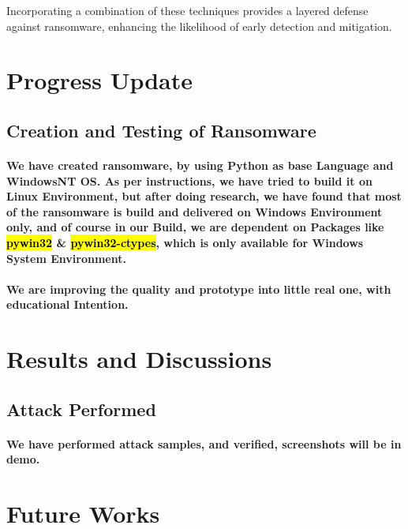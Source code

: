\documentclass[12pt,twocolumn]{article}
\begin{document}
Incorporating a combination of these techniques provides a layered defense against ransomware, enhancing the likelihood of early detection and mitigation.


%
\section{Progress Update}

\subsection{Creation and Testing of Ransomware}

\paragraph{We have created ransomware, by using Python as base Language and WindowsNT OS. As per instructions, we have tried to build it on Linux Environment, but after doing research, we have found that most of the ransomware is build and delivered on Windows Environment only, and of course in our Build, we are dependent on Packages like \hl{pywin32} \& \hl{pywin32-ctypes}, which is only available for Windows System Environment.}

\paragraph{We are improving the quality and prototype into little real one, with educational Intention.}


\section{Results and Discussions}

\subsection{Attack Performed}
\paragraph{We have performed attack samples, and verified, screenshots will be in demo.}




\section{Future Works}
\end{document}
